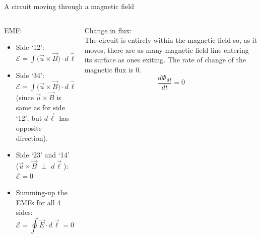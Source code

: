 \begin{frame}{A circuit moving through a magnetic field}
\begin{columns}[t]
  \begin{column}{0.50\textwidth}
  {\scriptsize
    \underline{EMF}:\\
    \vspace{0.2cm}
    \begin{itemize}
       \item Side `12':
             $\mathcal{E} = \int \Big( \vec{u} \times \vec{B} \Big) \cdot d\vec{\ell} = uBb$
       \item Side `34':
             $\mathcal{E} = \int \Big( \vec{u} \times \vec{B} \Big) \cdot d\vec{\ell} = -uBb$\\
             (since $\vec{u} \times \vec{B}$ is same as for side `12',
             but $d\vec{\ell}$ has opposite direction).
       \item Side `23' and `14' ($\vec{u} \times \vec{B}$ $\perp$ $d\vec{\ell}$):
             $\mathcal{E} = 0$
       \item Summing-up the EMFs for all 4 sides:
            {\color{magenta}
              \begin{equation*}
               \mathcal{E} = \oint \vec{E} \cdot d\vec{\ell} = 0
              \end{equation*}
            }
    \end{itemize}
  }
  \end{column}
  \begin{column}{0.50\textwidth}
  {\scriptsize
    \underline{Change in flux}:\\
    \vspace{0.1cm}
    The circuit is entirely within the magnetic field so, as it moves,
    there are as many magnetic field line entering its surface as ones exiting.
    The rate of change of the magnetic flux is 0.
    {\color{magenta}
      \begin{equation*}
        \frac{d\Phi_{M}}{dt} = 0
      \end{equation*}
    }
  }
  \end{column}
\end{columns}

\end{frame}

%
%
%

